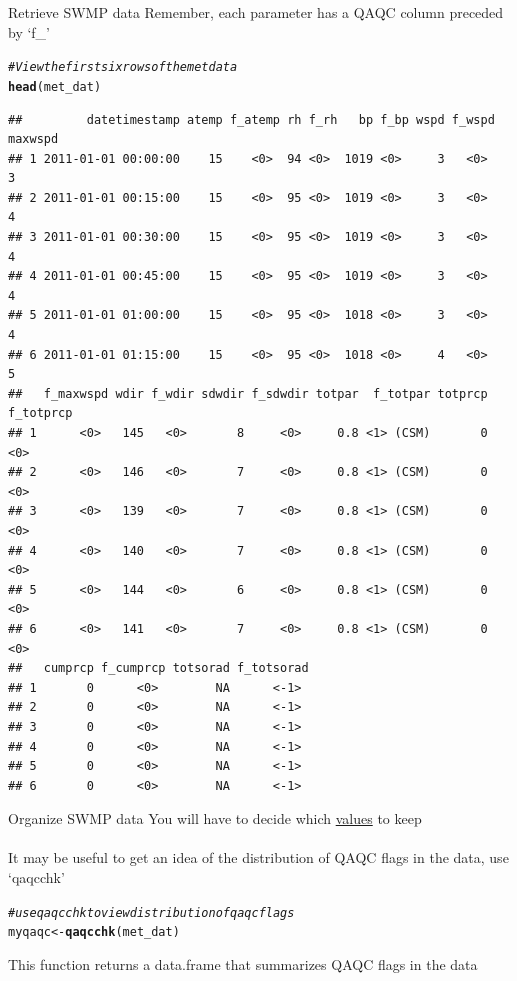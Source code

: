 \documentclass[xcolor=svgnames]{beamer}\usepackage[]{graphicx}\usepackage[]{color}
\makeatletter
\newcommand{\hlcom}[1]{\textcolor[rgb]{0.678,0.584,0.686}{\textit{#1}}}%
\newcommand{\hlstd}[1]{\textcolor[rgb]{0.345,0.345,0.345}{#1}}%
\newcommand{\hlkwb}[1]{\textcolor[rgb]{0.69,0.353,0.396}{#1}}%
\newcommand{\hlkwd}[1]{\textcolor[rgb]{0.737,0.353,0.396}{\textbf{#1}}}%
\newenvironment{kframe}{%
 \def\at@end@of@kframe{}%
 \ifinner\ifhmode%
  \def\at@end@of@kframe{\end{minipage}}%
  \begin{minipage}{\columnwidth}%
 \fi\fi%
 \def\FrameCommand##1{\hskip\@totalleftmargin \hskip-\fboxsep
 \colorbox{shadecolor}{##1}\hskip-\fboxsep
     \hskip-\linewidth \hskip-\@totalleftmargin \hskip\columnwidth}%
 \MakeFramed {\advance\hsize-\width
   \@totalleftmargin\z@ \linewidth\hsize
   \@setminipage}}%
 {\par\unskip\endMakeFramed%
 \at@end@of@kframe}
\newenvironment{knitrout}{}{} %
\makeatother
\begin{document}
\begin{frame}{Retrieve SWMP data}
Remember, each parameter has a QAQC column preceded by `f\_'
\begin{knitrout}\scriptsize
{}\color{fgcolor}\begin{kframe}
\begin{alltt}
\hlcom{# View the first six rows of the met data}
\hlkwd{head}\hlstd{(met_dat)}
\end{alltt}
\begin{verbatim}
##         datetimestamp atemp f_atemp rh f_rh   bp f_bp wspd f_wspd maxwspd
## 1 2011-01-01 00:00:00    15    <0>  94 <0>  1019 <0>     3   <0>        3
## 2 2011-01-01 00:15:00    15    <0>  95 <0>  1019 <0>     3   <0>        4
## 3 2011-01-01 00:30:00    15    <0>  95 <0>  1019 <0>     3   <0>        4
## 4 2011-01-01 00:45:00    15    <0>  95 <0>  1019 <0>     3   <0>        4
## 5 2011-01-01 01:00:00    15    <0>  95 <0>  1018 <0>     3   <0>        4
## 6 2011-01-01 01:15:00    15    <0>  95 <0>  1018 <0>     4   <0>        5
##   f_maxwspd wdir f_wdir sdwdir f_sdwdir totpar  f_totpar totprcp f_totprcp
## 1      <0>   145   <0>       8     <0>     0.8 <1> (CSM)       0      <0> 
## 2      <0>   146   <0>       7     <0>     0.8 <1> (CSM)       0      <0> 
## 3      <0>   139   <0>       7     <0>     0.8 <1> (CSM)       0      <0> 
## 4      <0>   140   <0>       7     <0>     0.8 <1> (CSM)       0      <0> 
## 5      <0>   144   <0>       6     <0>     0.8 <1> (CSM)       0      <0> 
## 6      <0>   141   <0>       7     <0>     0.8 <1> (CSM)       0      <0> 
##   cumprcp f_cumprcp totsorad f_totsorad
## 1       0      <0>        NA      <-1> 
## 2       0      <0>        NA      <-1> 
## 3       0      <0>        NA      <-1> 
## 4       0      <0>        NA      <-1> 
## 5       0      <0>        NA      <-1> 
## 6       0      <0>        NA      <-1>
\end{verbatim}
\end{kframe}
\end{knitrout}
\end{frame}

\begin{frame}[containsverbatim]{Organize SWMP data}
You will have to decide which \href{http://cdmo.baruch.sc.edu/data/qaqc.cfm}{values} to keep \\~\\
It may be useful to get an idea of the distribution of QAQC flags in the data, use `qaqcchk'
\begin{knitrout}\scriptsize
{}\color{fgcolor}\begin{kframe}
\begin{alltt}
\hlcom{# use qaqcchk to view distribution of qaqc flags}
\hlstd{myqaqc} \hlkwb{<-} \hlkwd{qaqcchk}\hlstd{(met_dat)}
\end{alltt}
\end{kframe}
\end{knitrout}
This function returns a data.frame that summarizes QAQC flags in the data
\end{frame}
\end{document}
